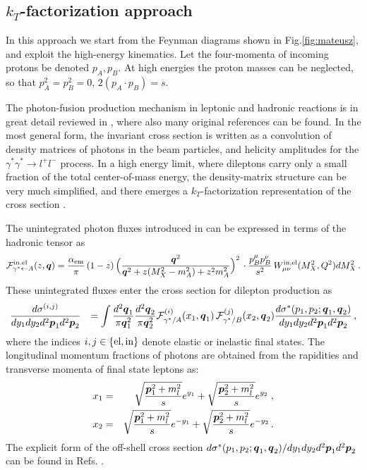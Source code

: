 

\subsection{$k_T$-factorization approach}

In this approach we start from the Feynman diagrams shown in Fig.\ref{fig:mateusz},
and exploit the high-energy kinematics.
Let the four-momenta of incoming protons be denoted $p_A,p_B$. At high energies 
the proton masses can be neglected, so that $p_A^2 = p_B^2 =0, \,  2 (p_A\cdot p_B) =s$.


The photon-fusion production mechanism in leptonic and hadronic reactions
is in great detail reviewed in \cite{Budnev:1974de}, where also many original
references can be found. In the most general form, the invariant cross section
is written as a convolution of density matrices of photons in the beam particles,
and helicity amplitudes for the $\gamma^* \gamma^* \to l^+ l^-$ process.
In a high energy limit, where dileptons carry only a small fraction of the 
total center-of-mass energy, the density-matrix structure can be very much
simplified, and there emerges a $k_T$-factorization representation of the
cross section \cite{daSilveira:2014jla}.

The unintegrated photon fluxes introduced in \cite{daSilveira:2014jla}
can be expressed in terms of the hadronic tensor as 
\begin{eqnarray}
 {\cal{F}}^{{\rm{in.el}}}_{\gamma^* \leftarrow A} (z,\mbox{\boldmath $q$}) = {\alpha_{\rm{em}}\over \pi}  \, (1-z) \, 
\Big( {\mbox{\boldmath $q$}^2 \over \mbox{\boldmath $q$}^2 + z (M_X^2 - m_A^2) + z^2 m_A^2  }\Big)^2  \, 
\cdot {p_B^\mu p_B^\nu \over s^2} \, W^{\rm{in,el}}_{\mu \nu}(M_X^2,Q^2) dM_X^2 \, . \nonumber \\
\end{eqnarray}
These unintegrated fluxes enter the cross section for dilepton production as
\begin{eqnarray}
 {d \sigma^{(i,j)} \over dy_1 dy_2 d^2\mbox{\boldmath $p$}_1 d^2\mbox{\boldmath $p$}_2} &&=  \int  {d^2 \mbox{\boldmath $q$}_1 \over \pi \mbox{\boldmath $q$}_1^2} {d^2 \mbox{\boldmath $q$}_2 \over \pi \mbox{\boldmath $q$}_2^2}  
 {\cal{F}}^{(i)}_{\gamma^*/A}(x_1,\mbox{\boldmath $q$}_1) \, {\cal{F}}^{(j)}_{\gamma^*/B}(x_2,\mbox{\boldmath $q$}_2) 
{d \sigma^*(p_1,p_2;\mbox{\boldmath $q$}_1,\mbox{\boldmath $q$}_2) \over dy_1 dy_2 d^2\mbox{\boldmath $p$}_1 d^2\mbox{\boldmath $p$}_2} \, , \nonumber \\ 
\label{eq:kt-fact}
\end{eqnarray}
where the indices $i,j \in \{\rm{el}, \rm{in} \}$ denote elastic or inelastic final states.
The longitudinal momentum fractions of photons are obtained from the rapidities 
and transverse momenta of final state leptons as:
\begin{eqnarray}
x_1 &=& \sqrt{ {\mbox{\boldmath $p$}_1^2 + m_l^2 \over s}} e^{y_1} +  \sqrt{ {\mbox{\boldmath $p$}_2^2 +
    m_l^2 \over s}} e^{y_2} 
\; , \nonumber \\
x_2 &=& \sqrt{ {\mbox{\boldmath $p$}_1^2 + m_l^2 \over s}} e^{-y_1} +  \sqrt{ {\mbox{\boldmath $p$}_2^2 + m_l^2 \over s}} e^{-y_2} \, .
\end{eqnarray}
The explicit form of the off-shell cross section $d \sigma^*(p_1,p_2;\mbox{\boldmath $q$}_1,\mbox{\boldmath $q$}_2)/ dy_1 dy_2 d^2\mbox{\boldmath $p$}_1 d^2\mbox{\boldmath $p$}_2$ can be found in
Refs. \cite{daSilveira:2014jla,Luszczak:2015aoa}. 



	
